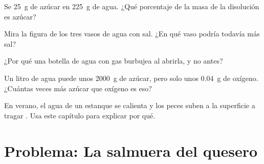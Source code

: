 \begin{exercise}[$\star\star$]\label{exo:g6:solutions-and-solubility:8}
Se  \qty{25}{g} de azúcar en \qty{225}{g} de agua. ¿Qué
porcentaje de la masa de la disolución es azúcar?
\end{exercise}

\begin{exercise}[$\star\star$]\label{exo:g6:solutions-and-solubility:9}
Mira la figura de los tres vasos de agua con sal. ¿En qué vaso podría
 todavía más sal?
\end{exercise}

\begin{exercise}[$\star\star$]\label{exo:g6:solutions-and-solubility:10}
¿Por qué una botella de agua con gas burbujea al abrirla, y no antes?
\end{exercise}

\begin{exercise}[$\star\star\star$]\label{exo:g6:solutions-and-solubility:11}
Un litro de agua puede  unos \qty{2000}{g} de azúcar, pero solo
unos \qty{0.04}{g} de oxígeno. ¿Cuántas veces más azúcar que oxígeno es
eso?
\end{exercise}

\begin{exercise}[$\star\star\star$]\label{exo:g6:solutions-and-solubility:12}
En verano, el agua de un estanque se calienta y los peces suben a la
superficie a tragar . Usa este capítulo para explicar por qué.
\end{exercise}

\section{Problema: La salmuera del quesero}

